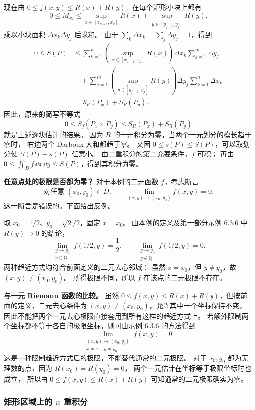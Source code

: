 现在由 $0\le f(x,y)\le R(x)+R(y)$，在每个矩形小块上都有
\[
0\le M_{kj}
\le\sup_{x\in[x_{k-1},x_k]}R(x)
+\sup_{y\in[y_{j-1},y_j]}R(y).
\]
乘以小块面积 $\Delta x_k\Delta y_j$ 后求和。
由于 $\sum_k\Delta x_k=\sum_j\Delta y_j=1$，得到
\[
\begin{aligned}
0\le S(P)
&\le
\sum_{k=1}^n
\left(\sup_{x\in[x_{k-1},x_k]}R(x)\right)\Delta x_k
\sum_{j=1}^m\Delta y_j\\
&\quad+
\sum_{j=1}^m
\left(\sup_{y\in[y_{j-1},y_j]}R(y)\right)\Delta y_j
\sum_{k=1}^n\Delta x_k\\
&=S_R(P_x)+S_R(P_y).
\end{aligned}
\]
因此，原来的简写不等式
\[
0\le S_f(P_x\times P_y)\le S_R(P_x)+S_R(P_y)
\]
就是上述逐块估计的结果。
因为 $R$ 的一元积分为零，当两个一元划分的模长趋于零时，
右边两个 Darboux 大和都趋于零。
又因 $0\le s(P)\le S(P)$，可以取划分使
$S(P)-s(P)$ 任意小。
由二重积分的第二充要条件，$f$ 可积；
再由 $0\le\displaystyle\iint_D f\,\dd x\,\dd y\le S(P)$，得到其积分为零。


\textbf{任意点处的极限是否都为零？}
对于本例的二元函数 $f$，考虑断言
\[
\text{对任意 }(x_0,y_0)\in D,\qquad
\lim_{(x,y)\to(x_0,y_0)}f(x,y)=0.
\]
这一断言是错误的。下面给出反例。

取 $x_0=1/2$、$y_0=\sqrt2/2$，固定 $x=x_0$。
由本例的定义及第一部分示例 6.3.6 中 $R(y)\to0$ 的结论，
\[
\lim_{\substack{y\to y_0\\y\in\mathbb Q}}f(1/2,y)=\frac12,
\qquad
\lim_{\substack{y\to y_0\\y\notin\mathbb Q}}f(1/2,y)=0.
\]
两种趋近方式均符合前面定义的二元去心邻域：
虽然 $x=x_0$，但 $y\ne y_0$，故 $(x,y)\ne(x_0,y_0)$。
所得极限不同，所以 $f$ 在该点的二元极限不存在。

\textbf{与一元 Riemann 函数的比较。}
虽然 $0\le f(x,y)\le R(x)+R(y)$，但按前面的定义，二元去心条件为
$(x,y)\ne(x_0,y_0)$，允许其中一个坐标保持不变。
因此不能把两个一元去心极限直接套用到所有这样的趋近方式上。
若额外限制两个坐标都不等于各自的极限坐标，则可由示例 6.3.6 的方法得到
\[
\lim_{\substack{(x,y)\to(x_0,y_0)\\x\ne x_0,\ y\ne y_0}}f(x,y)=0.
\]
这是一种限制趋近方式后的极限，不能替代通常的二元极限。
对于 $x_0,y_0$ 都为无理数的点，因为 $R(x_0)=R(y_0)=0$，
两个一元估计在坐标等于极限坐标时也成立，
所以由 $0\le f(x,y)\le R(x)+R(y)$ 可知通常的二元极限确实为零。




\subsubsection*{矩形区域上的 $n$ 重积分}



